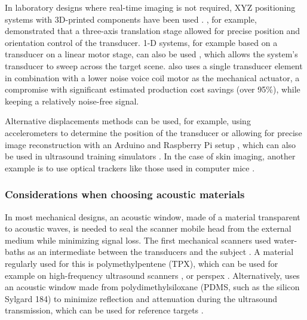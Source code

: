\documentclass{article}
\begin{document}
In laboratory designs where real-time imaging is not required, XYZ positioning systems with 3D-printed components have been used \cite{svilainis_electronics_2014, wang_high_2019, xu_enabling_2019}. \cite{bottenus_feasibility_2016}, for example, demonstrated that a three-axis translation stage allowed for precise position and orientation control of the transducer. 1-D systems, for example based on a transducer on a linear motor stage, can also be used  \cite{qiu_programmable_2011,govindan_reconfigurable_2015, soto-cajiga_fpga-based_2012,govindan_performance_2013}, which allows the system's transducer to sweep across the target scene. \cite{smith_design_2015} also uses a single transducer element in combination with a lower noise voice coil motor as the mechanical actuator, a compromise with significant estimated production cost savings (over 95\%), while keeping a relatively noise-free signal. 

Alternative displacements methods can be used, for example, using accelerometers to determine the position of the transducer  \cite{sobhani_portable_2016} or allowing for precise image reconstruction with an Arduino and Raspberry Pi setup \cite{herickhoff_low-cost_2019}, which can also be used in ultrasound training simulators \cite{farsoni_low-cost_2017}. In the case of skin imaging, another example is to use optical trackers like those used in computer mice \cite{zhang_free-hand_2019, poulsen_optical_2005, herickhoff_low-cost_2018}.


\subsubsection{Considerations when choosing acoustic  materials}

In most mechanical designs, an acoustic window, made of a material transparent to acoustic waves, is needed to seal the scanner mobile head from the external medium while minimizing signal loss. The first mechanical scanners used water-baths as an intermediate between the transducers and the subject \cite{schueler_fundamentals_1984}. A material regularly used for this is polymethylpentene (TPX), which can be used for example on high-frequency ultrasound scanners \cite{erickson_hand-held_2001,brown_low_2013}, or perspex \cite{bow_rotating_1979}.  Alternatively, \cite{qiu_ultrasound_2020} uses an acoustic window made from polydimethylsiloxane (PDMS, such as the silicon Sylgard 184) to minimize reflection and
attenuation during the ultrasound transmission, which can be used for reference targets \cite{lorenzo_experimental_2009,melde_holograms_2016}. 
\end{document}
